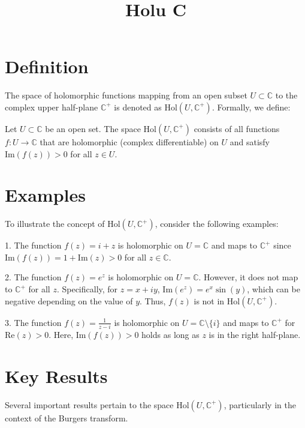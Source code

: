 \documentclass[11pt,a4paper]{article}
\title{Holu C}
\date{}
\begin{document}
\maketitle
\section{Definition}
The space of holomorphic functions mapping from an open subset $U \subset \mathbb{C}$ to the complex upper half-plane $\mathbb{C}^+$ is denoted as $\text{Hol}(U, \mathbb{C}^+)$. Formally, we define:

\begin{definition}
Let $U \subset \mathbb{C}$ be an open set. The space $\text{Hol}(U, \mathbb{C}^+)$ consists of all functions $f: U \to \mathbb{C}$ that are holomorphic (complex differentiable) on $U$ and satisfy $\text{Im}(f(z)) > 0$ for all $z \in U$.
\end{definition}

\section{Examples}
To illustrate the concept of $\text{Hol}(U, \mathbb{C}^+)$, consider the following examples:

\begin{example}
1. The function $f(z) = i + z$ is holomorphic on $U = \mathbb{C}$ and maps to $\mathbb{C}^+$ since $\text{Im}(f(z)) = 1 + \text{Im}(z) > 0$ for all $z \in \mathbb{C}$.

2. The function $f(z) = e^z$ is holomorphic on $U = \mathbb{C}$. However, it does not map to $\mathbb{C}^+$ for all $z$. Specifically, for $z = x + iy$, $\text{Im}(e^z) = e^x \sin(y)$, which can be negative depending on the value of $y$. Thus, $f(z)$ is not in $\text{Hol}(U, \mathbb{C}^+)$.

3. The function $f(z) = \frac{1}{z - i}$ is holomorphic on $U = \mathbb{C} \setminus \{i\}$ and maps to $\mathbb{C}^+$ for $\text{Re}(z) > 0$. Here, $\text{Im}(f(z)) > 0$ holds as long as $z$ is in the right half-plane.

\end{example}

\section{Key Results}
Several important results pertain to the space $\text{Hol}(U, \mathbb{C}^+)$, particularly in the context of the Burgers transform. 
\end{document}
